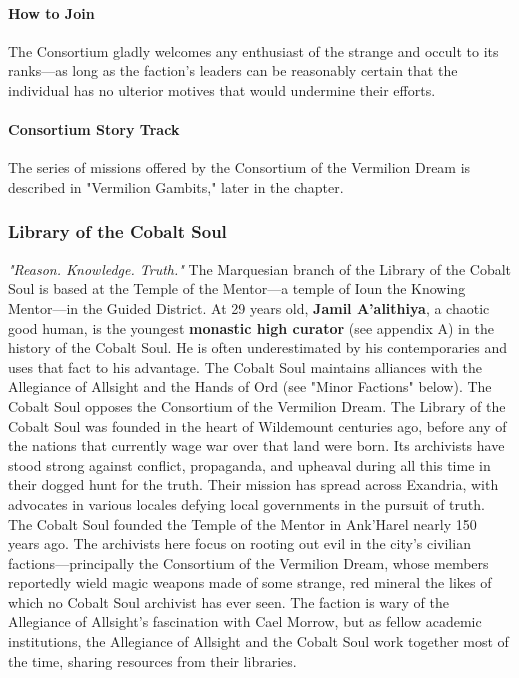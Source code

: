 \documentclass[10pt,a4,twoside,twocolumn,openany,nodeprecatedcode]{dndbook}
\begin{document}
\paragraph{How to Join}
The Consortium gladly welcomes any enthusiast of the strange and occult to its ranks—as long as the faction's leaders can be reasonably certain that the individual has no ulterior motives that would undermine their efforts.
\paragraph{Consortium Story Track}
The series of missions offered by the Consortium of the Vermilion Dream is described in "Vermilion Gambits," later in the chapter.
\subsubsection{Library of the Cobalt Soul}
\textit{"Reason. Knowledge. Truth."}
{{The Marquesian branch of the Library of the Cobalt Soul is based at the Temple of the Mentor—a temple of Ioun the Knowing Mentor—in the Guided District.}}
{{At 29 years old, \textbf{Jamil A'alithiya}, a chaotic good human, is the youngest \textbf{monastic high curator} (see appendix A) in the history of the Cobalt Soul. He is often underestimated by his contemporaries and uses that fact to his advantage.}}
{{The Cobalt Soul maintains alliances with the Allegiance of Allsight and the Hands of Ord (see "Minor Factions" below).}}
{{The Cobalt Soul opposes the Consortium of the Vermilion Dream.}}
The Library of the Cobalt Soul was founded in the heart of Wildemount centuries ago, before any of the nations that currently wage war over that land were born. Its archivists have stood strong against conflict, propaganda, and upheaval during all this time in their dogged hunt for the truth. Their mission has spread across Exandria, with advocates in various locales defying local governments in the pursuit of truth.
The Cobalt Soul founded the Temple of the Mentor in Ank'Harel nearly 150 years ago. The archivists here focus on rooting out evil in the city's civilian factions—principally the Consortium of the Vermilion Dream, whose members reportedly wield magic weapons made of some strange, red mineral the likes of which no Cobalt Soul archivist has ever seen.
The faction is wary of the Allegiance of Allsight's fascination with Cael Morrow, but as fellow academic institutions, the Allegiance of Allsight and the Cobalt Soul work together most of the time, sharing resources from their libraries.
\end{document}
